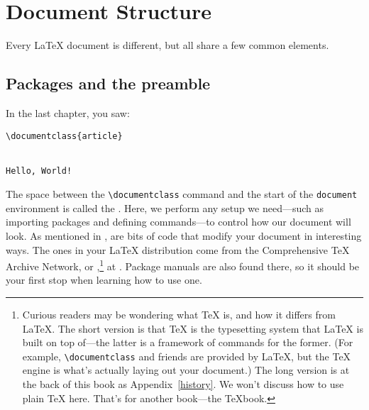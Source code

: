 \chapter{Document Structure}
\label{structure}

Every \LaTeX{} document is different,
but all share a few common elements.

\section{Packages and the preamble}
In the last chapter, you saw:
\begin{leftfigure}
\begin{lstlisting}
\documentclass{article}


Hello, World!

\end{lstlisting}
\end{leftfigure}
The space between the \verb|\documentclass| command and the start of the
\texttt{document} environment is called the .
Here, we perform any setup we need---such as importing packages
and defining commands---to control how our document
will look.
As mentioned in ,
 are bits of code that modify your document
in interesting ways.
The ones in your \LaTeX{} distribution come from the Comprehensive \TeX{}
Archive Network, or ,\punckern\footnote{Curious readers may
be wondering what \TeX{} is, and how it differs from \LaTeX.
The short version is that \TeX{} is the typesetting system that \LaTeX{}
is built on top of---the latter is a framework of commands for the former.
(For example, \texttt{\textbackslash documentclass} and friends are provided by
\LaTeX{}, but the \TeX{} engine is what's actually laying out your document.)
The long version is at the back of this book as Appendix~\ref{history}.
We won't discuss how to use plain \TeX{} here. That's for another book---the
\TeX book.}
at .
Package manuals are also found there,
so it should be your first stop when learning how to use one.

